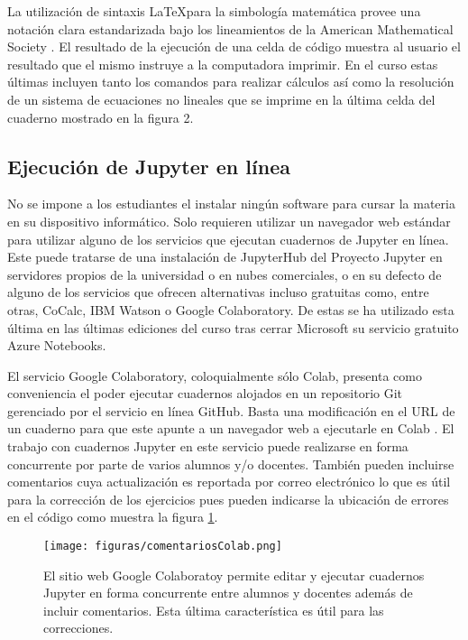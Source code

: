 La utilización de sintaxis \LaTeX para la simbología matemática provee una notación clara estandarizada bajo los lineamientos de la American Mathematical Society \cite{ams}.
El resultado de la ejecución de una celda de código muestra al usuario el resultado que el mismo instruye a la computadora imprimir. En el curso estas últimas incluyen tanto los comandos para realizar cálculos así como la resolución de un sistema de ecuaciones no lineales que se imprime en la última celda del cuaderno mostrado en la figura 2.  

\subsection{Ejecución de Jupyter en línea}

No se impone a los estudiantes el instalar ningún software para cursar la materia en su dispositivo informático. Solo requieren utilizar un navegador web estándar para utilizar alguno de los servicios que ejecutan cuadernos de Jupyter en línea. Este puede tratarse de una instalación de JupyterHub del Proyecto Jupyter en servidores propios de la universidad o en nubes comerciales, o en su defecto de alguno de los servicios que ofrecen alternativas incluso gratuitas como, entre otras, CoCalc, IBM Watson o Google Colaboratory. De estas se ha utilizado esta última en las últimas ediciones del curso tras cerrar Microsoft su servicio gratuito Azure Notebooks.

El servicio Google Colaboratory, coloquialmente sólo Colab,  presenta como conveniencia el poder ejecutar cuadernos alojados en un repositorio Git gerenciado por el servicio en línea GitHub. Basta una modificación en el URL de un cuaderno para que este apunte a un navegador web a ejecutarle en Colab \cite{colab}. El trabajo con cuadernos Jupyter en este servicio puede realizarse en forma concurrente por parte de varios alumnos y/o docentes. También pueden incluirse comentarios cuya actualización es reportada por correo electrónico lo que es útil para la corrección de los ejercicios pues pueden indicarse la ubicación de errores en el código como muestra la figura \ref{fig:colab}.

\begin{figure}[!ht]
\centering
\texttt{[image: figuras/comentariosColab.png]}
\caption{El sitio web Google Colaboratoy permite editar y ejecutar cuadernos Jupyter en forma concurrente entre alumnos y docentes además de incluir comentarios. Esta última característica es útil para las correcciones.}
\label{fig:colab}
\end{figure}

